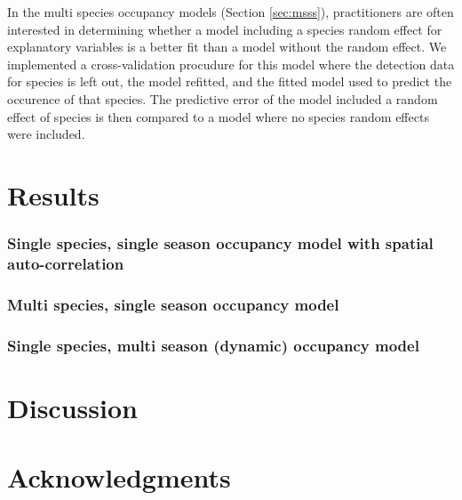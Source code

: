\documentclass[12pt]{article}
\begin{document}
In the multi species occupancy models (Section \ref{sec:msss}),
practitioners are often interested in determining whether a model
including a species random effect for explanatory variables is a
better fit than a model without the random effect. We implemented a
cross-validation procudure for this model where the detection data for
species is left out, the model refitted, and the fitted model used to
predict the occurence of that species. The predictive error of the
model included a random effect of species is then compared to a model
where no species random effects were included.

\section*{Results}
\label{sec:results}
\subsubsection*{Single species, single season occupancy model with
  spatial auto-correlation}


\subsubsection*{Multi species, single season occupancy model}
\label{sec:msss}

\subsubsection*{Single species, multi season (dynamic) occupancy
  model}

\section*{Discussion}
\label{sec:discussion}

\section*{Acknowledgments}
\label{sec:acknowledge}





\end{document}
